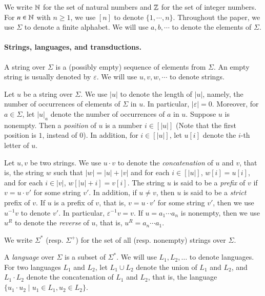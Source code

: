 
We write $\mathbb{N}$ for the set of natural numbers and $\mathbb{Z}$ for the set of integer numbers. For $n \in \mathbb{N}$ with $n \ge 1$, we use $[n]$ to denote $\{1, \cdots, n\}$. Throughout the paper, we use $\Sigma$ to denote a  finite alphabet. We will use $a,b,\cdots$ to denote the elements of $\Sigma$.

\paragraph*{Strings, languages, and transductions.}
A string over $\Sigma$ is a (possibly empty) sequence of elements from $\Sigma$. An empty string is usually denoted by $\varepsilon$. We will use $u, v, w, \cdots$ to denote strings. 

Let $u$ be a string over $\Sigma$. We use $|u|$ to denote the length of $|u|$, namely, the number of occurrences of elements of $\Sigma$ in $u$. In particular, $|\varepsilon|=0$. Moreover, for $a \in \Sigma$, let $|u|_a$ denote the number of occurrences of $a$ in $u$. Suppose $u$ is nonempty. Then a \emph{position} of $u$ is a number $i \in [|u|]$ (Note that the first position is $1$, instead of  0). In addition, for $i \in [|u|]$, let $u[i]$ denote the $i$-th letter of $u$. 

Let $u, v$ be two strings. We use $u \cdot v$ to denote the \emph{concatenation} of $u$ and $v$, that is, the string $w$ such that $|w|= |u| + |v|$ and for each $i \in [|u|]$, $w[i]= u[i]$, and for each $i \in |v|$, $w[|u|+i]=v[i]$. The string $u$ is said to be a \emph{prefix} of $v$ if $v = u \cdot v'$ for some string $v'$.
In addition, if $u \neq v$, then $u$ is said to be a \emph{strict} prefix of $v$. If $u$ is a prefix of $v$, that is, $v = u \cdot v'$ for some string $v'$, then 
we use $u^{-1} v$ to denote $v'$. In particular, $\varepsilon^{-1} v = v$.
If $u=a_1 \cdots a_n$ is nonempty, then we use $u^R$ to denote the \emph{reverse} of $u$, that is, $u^R= a_n \cdots a_1$.

We write $\Sigma^*$ (resp. $\Sigma^+$) for the set of all (resp. nonempty) strings over $\Sigma$. 

A \emph{language} over $\Sigma$ is a subset of $\Sigma^*$.  
We will use $L_1, L_2, \dots$ to denote languages. For two languages $L_1$ and $L_2$, let $L_1 \cup L_2$ denote the union of $L_1$ and $L_2$, and $L_1 \cdot L_2$ denote the concatenation of $L_1$ and $L_2$, that is, the language $\{u_1 \cdot u_2 \mid u_1 \in L_1, u_2 \in L_2\}$. 

